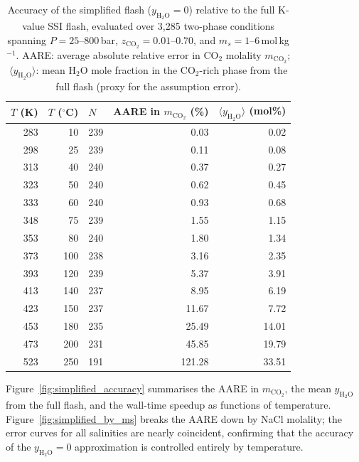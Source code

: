 \documentclass[preprint,12pt,number]{elsarticle}
\begin{document}
\begin{table}[H]
  \centering
  \caption{Accuracy of the simplified flash ($y_{\text{H}_2\text{O}} = 0$) relative to
           the full K-value SSI flash, evaluated over 3{,}285 two-phase conditions
           spanning $P = 25$--$800$\,bar, $z_{\text{CO}_2} = 0.01$--$0.70$, and
           $m_s = 1$--$6$\,mol\,kg$^{-1}$.
           AARE: average absolute relative error in CO$_2$ molality $m_{\text{CO}_2}$;
           $\langle y_{\text{H}_2\text{O}}\rangle$: mean H$_2$O mole fraction in the
           CO$_2$-rich phase from the full flash (proxy for the assumption error).}
  \label{tab:simplified_accuracy}
  \small
  \begin{tabular}{rrlrr}
    \toprule
    $T$ (K) & $T$ ($^\circ$C) & $N$ & AARE in $m_{\text{CO}_2}$ (\%) & $\langle y_{\text{H}_2\text{O}}\rangle$ (mol\%) \\
    \midrule
    283 &  10 & 239 & 0.03 & 0.02 \\
    298 &  25 & 239 & 0.11 & 0.08 \\
    313 &  40 & 240 & 0.37 & 0.27 \\
    323 &  50 & 240 & 0.62 & 0.45 \\
    333 &  60 & 240 & 0.93 & 0.68 \\
    348 &  75 & 239 & 1.55 & 1.15 \\
    353 &  80 & 240 & 1.80 & 1.34 \\
    373 & 100 & 238 & 3.16 & 2.35 \\
    393 & 120 & 239 & 5.37 & 3.91 \\
    413 & 140 & 237 & 8.95 & 6.19 \\
    423 & 150 & 237 &11.67 & 7.72 \\
    453 & 180 & 235 &25.49 &14.01 \\
    473 & 200 & 231 &45.85 &19.79 \\
    523 & 250 & 191 &121.28&33.51 \\
    \bottomrule
  \end{tabular}
\end{table}

Figure~\ref{fig:simplified_accuracy} summarises the AARE in $m_{\text{CO}_2}$, the mean
$y_{\text{H}_2\text{O}}$ from the full flash, and the wall-time speedup as functions of
temperature.
Figure~\ref{fig:simplified_by_ms} breaks the AARE down by NaCl molality; the error
curves for all salinities are nearly coincident, confirming that the accuracy of the
$y_{\text{H}_2\text{O}} = 0$ approximation is controlled entirely by temperature.
\end{document}
